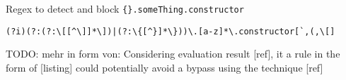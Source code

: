 Regex to detect and block \verb|{}.someThing.constructor|

\begin{lstlisting}[style=basicStyle, caption=regex of rule proposal 2, label={lst:constructorsruleproposalregex}]
  (?i)(?:(?:\[[^\]]*\])|(?:\{[^}]*\}))\.[a-z]*\.constructor[`,(,\[]
\end{lstlisting}


{\color{red} TODO: mehr in form von: Considering evaluation result [ref], it a rule in the form of [listing] could potentially avoid a bypass using the technique [ref]}
